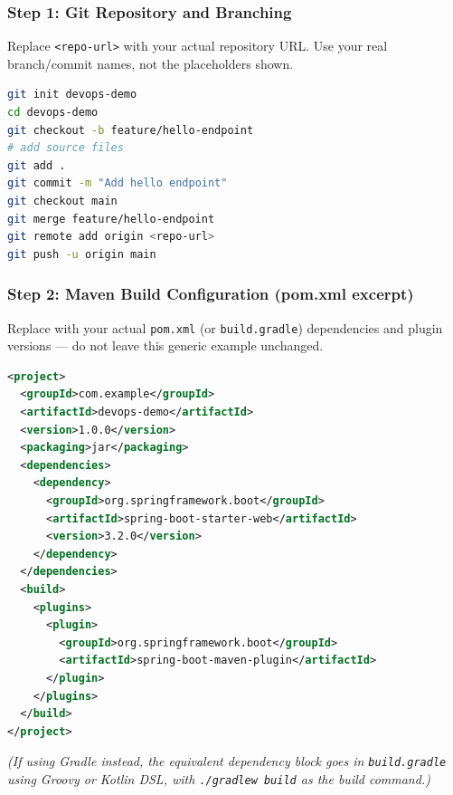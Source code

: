 \documentclass[12pt,a4paper]{article}
\begin{document}
\subsubsection*{Step 1: Git Repository and Branching}
\begin{studentnote}
Replace \texttt{<repo-url>} with your actual repository URL. Use your real branch/commit names, not the placeholders shown.
\end{studentnote}
\begin{lstlisting}[language=bash]
git init devops-demo
cd devops-demo
git checkout -b feature/hello-endpoint
# add source files
git add .
git commit -m "Add hello endpoint"
git checkout main
git merge feature/hello-endpoint
git remote add origin <repo-url>
git push -u origin main
\end{lstlisting}

\subsubsection*{Step 2: Maven Build Configuration (pom.xml excerpt)}
\begin{studentnote}
Replace with your actual \texttt{pom.xml} (or \texttt{build.gradle}) dependencies and plugin versions --- do not leave this generic example unchanged.
\end{studentnote}
\begin{lstlisting}[language=XML]
<project>
  <groupId>com.example</groupId>
  <artifactId>devops-demo</artifactId>
  <version>1.0.0</version>
  <packaging>jar</packaging>
  <dependencies>
    <dependency>
      <groupId>org.springframework.boot</groupId>
      <artifactId>spring-boot-starter-web</artifactId>
      <version>3.2.0</version>
    </dependency>
  </dependencies>
  <build>
    <plugins>
      <plugin>
        <groupId>org.springframework.boot</groupId>
        <artifactId>spring-boot-maven-plugin</artifactId>
      </plugin>
    </plugins>
  </build>
</project>
\end{lstlisting}

\textit{(If using Gradle instead, the equivalent dependency block goes in \texttt{build.gradle} using Groovy or Kotlin DSL, with \texttt{./gradlew build} as the build command.)}
\end{document}
